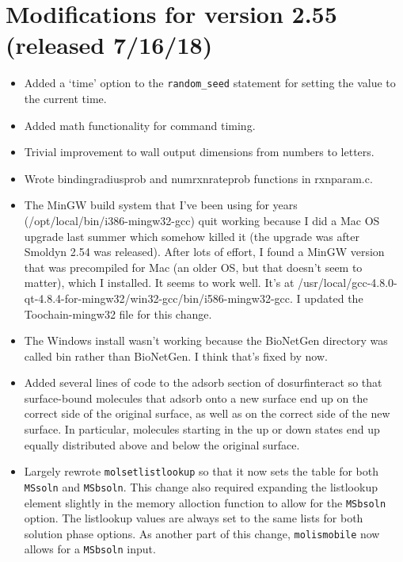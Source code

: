 \documentclass {scrbook}
\newcommand {\ttt} {\texttt}
\begin{document}
\section{Modifications for version 2.55 (released 7/16/18)}
\begin{itemize}
\item Added a `time' option to the \ttt{random\_seed} statement for setting the value to the current time.
\item Added math functionality for command timing.
\item Trivial improvement to wall output dimensions from numbers to letters.
\item Wrote bindingradiusprob and numrxnrateprob functions in rxnparam.c.
\item The MinGW build system that I've been using for years (/opt/local/bin/i386-mingw32-gcc) quit working because I did a Mac OS upgrade last summer which somehow killed it (the upgrade was after Smoldyn 2.54 was released). After lots of effort, I found a MinGW version that was precompiled for Mac (an older OS, but that doesn't seem to matter), which I installed. It seems to work well. It's at /usr/local/gcc-4.8.0-qt-4.8.4-for-mingw32/win32-gcc/bin/i586-mingw32-gcc. I updated the Toochain-mingw32 file for this change.
\item The Windows install wasn't working because the BioNetGen directory was called bin rather than BioNetGen. I think that's fixed by now.
\item Added several lines of code to the adsorb section of dosurfinteract so that surface-bound molecules that adsorb onto a new surface end up on the correct side of the original surface, as well as on the correct side of the new surface. In particular, molecules starting in the up or down states end up equally distributed above and below the original surface.
\item Largely rewrote \ttt{molsetlistlookup} so that it now sets the table for both \ttt{MSsoln} and \ttt{MSbsoln}. This change also required expanding the listlookup element slightly in the memory alloction function to allow for the \ttt{MSbsoln} option. The listlookup values are always set to the same lists for both solution phase options. As another part of this change, \ttt{molismobile} now allows for a \ttt{MSbsoln} input.
\end{itemize}
\end{document}
